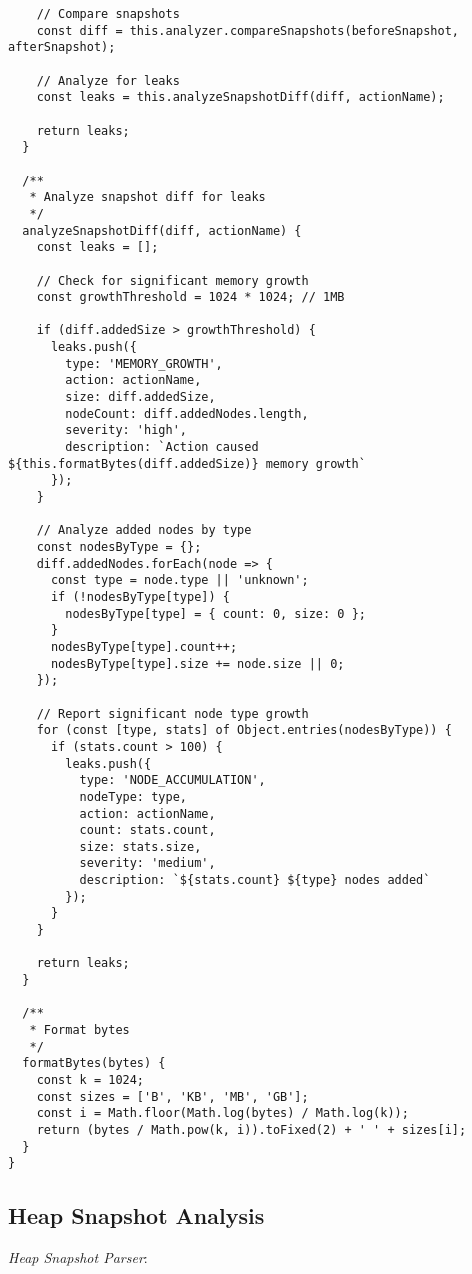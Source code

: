 \documentclass[11pt]{article}
\begin{document}
\begin{verbatim}
    // Compare snapshots
    const diff = this.analyzer.compareSnapshots(beforeSnapshot, afterSnapshot);
    
    // Analyze for leaks
    const leaks = this.analyzeSnapshotDiff(diff, actionName);
    
    return leaks;
  }
  
  /**
   * Analyze snapshot diff for leaks
   */
  analyzeSnapshotDiff(diff, actionName) {
    const leaks = [];
    
    // Check for significant memory growth
    const growthThreshold = 1024 * 1024; // 1MB
    
    if (diff.addedSize > growthThreshold) {
      leaks.push({
        type: 'MEMORY_GROWTH',
        action: actionName,
        size: diff.addedSize,
        nodeCount: diff.addedNodes.length,
        severity: 'high',
        description: `Action caused ${this.formatBytes(diff.addedSize)} memory growth`
      });
    }
    
    // Analyze added nodes by type
    const nodesByType = {};
    diff.addedNodes.forEach(node => {
      const type = node.type || 'unknown';
      if (!nodesByType[type]) {
        nodesByType[type] = { count: 0, size: 0 };
      }
      nodesByType[type].count++;
      nodesByType[type].size += node.size || 0;
    });
    
    // Report significant node type growth
    for (const [type, stats] of Object.entries(nodesByType)) {
      if (stats.count > 100) {
        leaks.push({
          type: 'NODE_ACCUMULATION',
          nodeType: type,
          action: actionName,
          count: stats.count,
          size: stats.size,
          severity: 'medium',
          description: `${stats.count} ${type} nodes added`
        });
      }
    }
    
    return leaks;
  }
  
  /**
   * Format bytes
   */
  formatBytes(bytes) {
    const k = 1024;
    const sizes = ['B', 'KB', 'MB', 'GB'];
    const i = Math.floor(Math.log(bytes) / Math.log(k));
    return (bytes / Math.pow(k, i)).toFixed(2) + ' ' + sizes[i];
  }
}
\end{verbatim}
\subsection{Heap Snapshot Analysis}
\label{sec:org760a96e}

\emph{Heap Snapshot Parser}:
\end{document}
